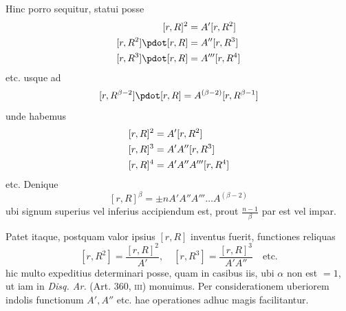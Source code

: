 Hinc porro sequitur, statui posse
\[
\begin{aligned}
[r,R]^2&=A'[r,R^2]\\
\relax[r,R^2]\pdot[r,R]&=A''[r,R^3]\\
\relax[r,R^3]\pdot[r,R]&=A'''[r,R^4]
\end{aligned}
\]
etc. usque ad
\[
[r,R^{\beta-2}]\pdot[r,R]=A^{(\beta-2)}[r,R^{\beta-1}]
\]
unde habemus
\[
\begin{aligned}
[r,R]^2&=A'[r,R^2]\\
\relax[r,R]^3&=A'A''[r,R^3]\\
\relax[r,R]^4&=A'A''A'''[r,R^4]
\end{aligned}
\]
etc. Denique
\[
[r,R]^\beta=\pm nA'A''A'''\dots A^{(\beta-2)}
\]
ubi signum superius vel inferius accipiendum est, prout $\frac{n-1}\beta$ par est vel impar.

Patet itaque, postquam valor ipsius $[r,R]$ inventus fuerit, functiones reliquas
\[
[r,R^2]=\frac{[r,R]^2}{A'},\quad[r,R^3]=\frac{[r,R]^3}{A'A''}\quad\text{etc.}
\]
hic multo expeditius determinari posse, quam in casibus iis, ubi $\alpha$ non est $=1$,
ut iam in \emph{Disq. Ar.} (Art. 360, \textsc{iii}) monuimus. Per considerationem uberiorem indolis functionum $A',A''$ etc. hae operationes adhuc magis facilitantur.

